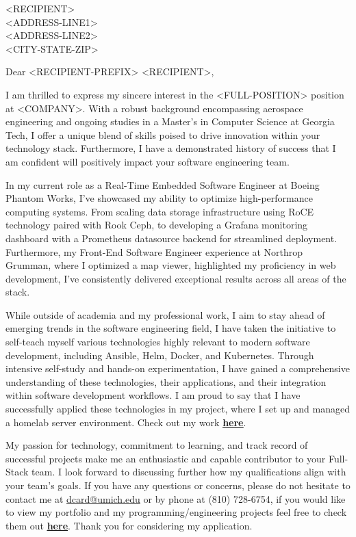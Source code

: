 \large
\bigskip\begin{minipage}[h]{\linewidth}
    \begin{raggedright}
        <RECIPIENT>\\
        <ADDRESS-LINE1>\\
        <ADDRESS-LINE2>\\
        <CITY-STATE-ZIP>\\
    \end{raggedright}
\end{minipage}

\bigskip Dear <RECIPIENT-PREFIX> <RECIPIENT>,

\medskip I am thrilled to express my sincere interest in the <FULL-POSITION> position at <COMPANY>. With a robust background encompassing aerospace engineering and ongoing studies in a Master's in Computer Science at Georgia Tech, I offer a unique blend of skills poised to drive innovation within your technology stack. Furthermore, I have a demonstrated history of success that I am confident will positively impact your software engineering team.

\medskip In my current role as a Real-Time Embedded Software Engineer at Boeing Phantom Works, I've showcased my ability to optimize high-performance computing systems. From scaling data storage infrastructure using RoCE technology paired with Rook Ceph, to developing a Grafana monitoring dashboard with a Prometheus datasource backend for streamlined deployment. Furthermore, my Front-End Software Engineer experience at Northrop Grumman, where I optimized a map viewer, highlighted my proficiency in web development, I've consistently delivered exceptional results across all areas of the stack.

\medskip While outside of academia and my professional work, I aim to stay ahead of emerging trends in the software engineering field, I have taken the initiative to self-teach myself various technologies highly relevant to modern software development, including Ansible, Helm, Docker, and Kubernetes. Through intensive self-study and hands-on experimentation, I have gained a comprehensive understanding of these technologies, their applications, and their integration within software development workflows. I am proud to say that I have successfully applied these technologies in my project, where I set up and managed a homelab server environment. Check out my work \href{https://github.com/dancard32/homelab}{\textbf{\underline{here}}}.

\medskip My passion for technology, commitment to learning, and track record of successful projects make me an enthusiastic and capable contributor to your Full-Stack team. I look forward to discussing further how my qualifications align with your team's goals. If you have any questions or concerns, please do not hesitate to contact me at \href{mailto:dcard@umich.edu}{dcard@umich.edu} or by phone at (810) 728-6754, if you would like to view my portfolio and my programming/engineering projects feel free to check them out \href{https://dancard32.github.io/website/#/projects}{\textbf{\underline{here}}}. Thank you for considering my application.

